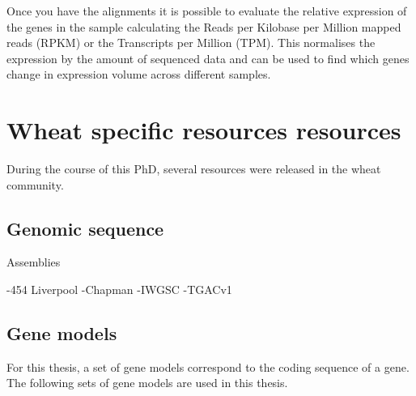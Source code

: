 Once you have the alignments it is possible to evaluate the relative expression of the genes in the sample calculating the Reads per Kilobase per Million mapped reads (RPKM) or the Transcripts per Million (TPM). This normalises the expression by the amount of sequenced data and can be used to find which genes change in expression volume across different samples.   


\section{Wheat specific resources resources}
\label{lit:wheatResourcers}

During the course of this PhD, several resources were released in the wheat community. 

\subsection{Genomic sequence}
Assemblies 

-454 Liverpool
-Chapman
-IWGSC
-TGACv1


\subsection{Gene models}

For this thesis, a set of gene models correspond to the coding sequence of a gene. 
The following sets of gene models are used in this thesis. 

